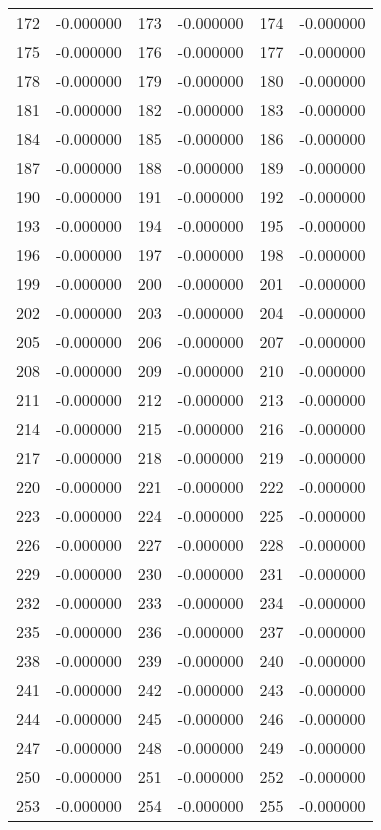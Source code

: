 \documentclass[12pt]{article}
\begin{document}
\begin{longtable}{@{}cc|cc|cc@{}}
172 & -0.000000 & 173 & -0.000000 & 174 & -0.000000 \\
175 & -0.000000 & 176 & -0.000000 & 177 & -0.000000 \\
178 & -0.000000 & 179 & -0.000000 & 180 & -0.000000 \\
181 & -0.000000 & 182 & -0.000000 & 183 & -0.000000 \\
184 & -0.000000 & 185 & -0.000000 & 186 & -0.000000 \\
187 & -0.000000 & 188 & -0.000000 & 189 & -0.000000 \\
190 & -0.000000 & 191 & -0.000000 & 192 & -0.000000 \\
193 & -0.000000 & 194 & -0.000000 & 195 & -0.000000 \\
196 & -0.000000 & 197 & -0.000000 & 198 & -0.000000 \\
199 & -0.000000 & 200 & -0.000000 & 201 & -0.000000 \\
202 & -0.000000 & 203 & -0.000000 & 204 & -0.000000 \\
205 & -0.000000 & 206 & -0.000000 & 207 & -0.000000 \\
208 & -0.000000 & 209 & -0.000000 & 210 & -0.000000 \\
211 & -0.000000 & 212 & -0.000000 & 213 & -0.000000 \\
214 & -0.000000 & 215 & -0.000000 & 216 & -0.000000 \\
217 & -0.000000 & 218 & -0.000000 & 219 & -0.000000 \\
220 & -0.000000 & 221 & -0.000000 & 222 & -0.000000 \\
223 & -0.000000 & 224 & -0.000000 & 225 & -0.000000 \\
226 & -0.000000 & 227 & -0.000000 & 228 & -0.000000 \\
229 & -0.000000 & 230 & -0.000000 & 231 & -0.000000 \\
232 & -0.000000 & 233 & -0.000000 & 234 & -0.000000 \\
235 & -0.000000 & 236 & -0.000000 & 237 & -0.000000 \\
238 & -0.000000 & 239 & -0.000000 & 240 & -0.000000 \\
241 & -0.000000 & 242 & -0.000000 & 243 & -0.000000 \\
244 & -0.000000 & 245 & -0.000000 & 246 & -0.000000 \\
247 & -0.000000 & 248 & -0.000000 & 249 & -0.000000 \\
250 & -0.000000 & 251 & -0.000000 & 252 & -0.000000 \\
253 & -0.000000 & 254 & -0.000000 & 255 & -0.000000 \\

\end{longtable}
\end{document}
